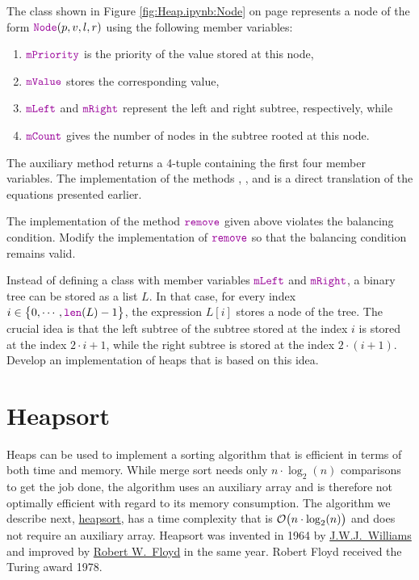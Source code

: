 The class  shown in Figure \ref{fig:Heap.ipynb:Node} on page \pageref{fig:Heap.ipynb:Node}
represents a node of the form $\mytt{Node}(p, v, l, r)$ using the following member variables:
\begin{enumerate}
\item $\mytt{mPriority}$ is the priority of the value stored at this node,
\item $\mytt{mValue}$    stores the corresponding value,
\item $\mytt{mLeft}$ and $\mytt{mRight}$ represent the left and right subtree, respectively, while
\item $\mytt{mCount}$    gives the number of nodes in the subtree rooted at this node.
\end{enumerate}
The auxiliary method  returns a 4-tuple containing the first four member variables.
The implementation of the methods , , and  is a direct translation of
the equations presented earlier.

\exercise
The implementation of the method $\mytt{remove}$ given above violates the balancing condition.
Modify the implementation of $\mytt{remove}$ so that the balancing condition remains valid. \eox

\exercise
Instead of defining a class with member variables $\mytt{mLeft}$ and $\mytt{mRight}$, a binary tree
can be stored as a list $L$.  In that case, for every index $i \in \bigl\{0, \cdots, \mytt{len}(L)-1 \bigl\}$,
the expression $L[i]$ stores a node of the tree.  The crucial idea is that the left subtree of the
subtree stored at the index $i$ is stored at the index $2 \cdot i + 1$, while the right subtree is
stored at the index $2 \cdot (i + 1)$.  Develop an implementation of heaps that is based on this idea.
\eox

\section{Heapsort \label{sec:heapsort}}
Heaps can be used to implement a sorting algorithm that is efficient in terms of both time and
memory. While merge sort needs only $n \cdot \log_2(n)$ comparisons to get the job done, the
algorithm uses an auxiliary array and is therefore not optimally efficient with regard to its memory
consumption.  The algorithm we describe next, \href{https://en.wikipedia.org/wiki/Heapsort}{heapsort}, has
a time complexity that is $\mathcal{O}\bigl(n \cdot \log_2(n)\bigr)$ and does not require an auxiliary
array.  Heapsort  was invented in 1964 by
\href{https://en.wikipedia.org/wiki/J._W._J._Williams}{J.W.J.~Williams} \cite{williams:1964}
and improved by \href{https://en.wikipedia.org/wiki/Robert_W._Floyd}{Robert W.~Floyd} \cite{floyd:1964} in the
same year.  Robert Floyd received the Turing award 1978.

